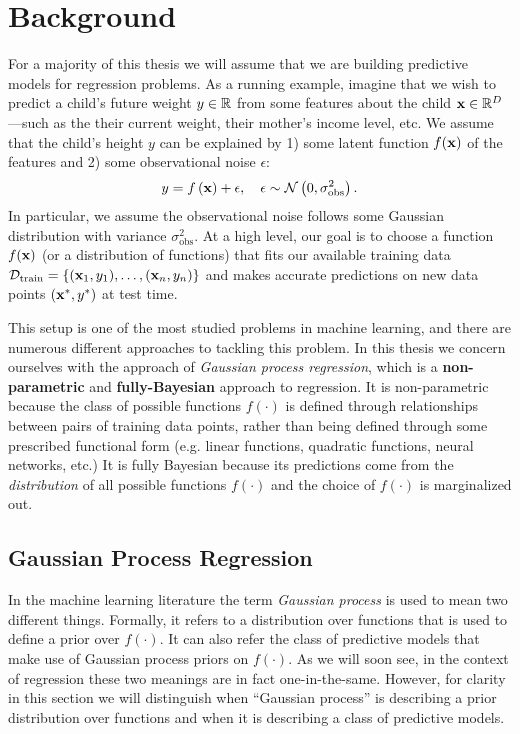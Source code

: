 \chapter{Background}

For a majority of this thesis we will assume that we are building predictive models for regression problems.
As a running example, imagine that we wish to predict a child's future weight $y \in \mathbb{R}$ from some features about the child $\mathbf{x} \in \mathbb{R}^{D}$---such as the their current weight, their mother's income level, etc.
We assume that the child's height $y$ can be explained by 1) some latent function $f(\mathbf{x})$ of the features and 2) some observational noise $\epsilon$:
%
\begin{equation}
  y = f \left( \mathbf{x} \right) + \epsilon, \quad \epsilon \sim \mathcal{N} \left( 0, \sigma_\text{obs}^2 \right).
  \label{eqn:regression}
\end{equation}
%
In particular, we assume the observational noise follows some Gaussian distribution with variance $\sigma_\text{obs}^2$.
At a high level, our goal is to choose a function $f(\mathbf{x})$ (or a distribution of functions) that fits our available training data $\mathcal D_\text{train} = \{(\mathbf{x}_1, y_1), \ldots, (\mathbf{x}_n, y_n)\}$ and makes accurate predictions on new data points $( \mathbf{x}^*, y^* )$ at test time.

This setup is one of the most studied problems in machine learning, and there are numerous different approaches to tackling this problem.
In this thesis we concern ourselves with the approach of \emph{Gaussian process regression}, which is a {\bf non-parametric} and {\bf fully-Bayesian} approach to regression.
It is non-parametric because the class of possible functions $f(\cdot)$ is defined through relationships between pairs of training data points,
rather than being defined through some prescribed functional form (e.g. linear functions, quadratic functions, neural networks, etc.)
It is fully Bayesian because its predictions come from the \emph{distribution} of all possible functions $f(\cdot)$ and the choice of $f(\cdot)$ is marginalized out.

\section{Gaussian Process Regression}

In the machine learning literature the term \emph{Gaussian process} is used to mean two different things.
Formally, it refers to a distribution over functions that is used to define a prior over $f(\cdot)$.
It can also refer the class of predictive models that make use of Gaussian process priors on $f(\cdot)$.
As we will soon see, in the context of regression these two meanings are in fact one-in-the-same.
However, for clarity in this section we will distinguish when ``Gaussian process'' is describing a prior distribution over functions and when it is describing a class of predictive models.


